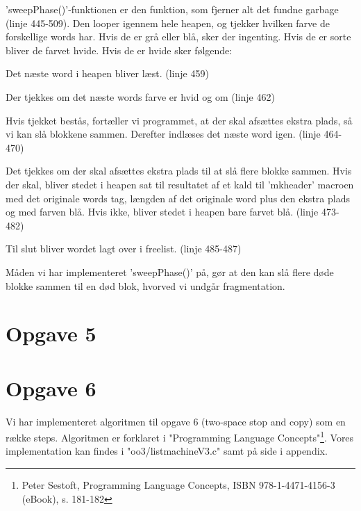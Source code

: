 'sweepPhase()'-funktionen er den funktion, som fjerner alt det fundne garbage (linje 445-509). Den looper igennem hele heapen, og tjekker hvilken farve de forskellige words har. Hvis de er grå eller blå, sker der ingenting. Hvis de er sorte bliver de farvet hvide. Hvis de er hvide sker følgende:
\begin{my_enumerate}
	\item Det næste word i heapen bliver læst. (linje 459)
	\item Der tjekkes om det næste words farve er hvid og om (linje 462) %
	\item Hvis tjekket bestås, fortæller vi programmet, at der skal afsættes ekstra plads, så vi kan slå blokkene sammen. Derefter indlæses det næste word igen. (linje 464-470)
	\item Det tjekkes om der skal afsættes ekstra plads til at slå flere blokke sammen. Hvis der skal, bliver stedet i heapen sat til resultatet af et kald til 'mkheader' macroen med det originale words tag, længden af det originale word plus den ekstra plads og med farven blå. Hvis ikke, bliver stedet i heapen bare farvet blå. (linje 473-482)
	\item Til slut bliver wordet lagt over i freelist. (linje 485-487)
\end{my_enumerate}

Måden vi har implementeret 'sweepPhase()' på, gør at den kan slå flere døde blokke sammen til en død blok, hvorved vi undgår fragmentation.

\section{Opgave 5}
\label{O5}

\section{Opgave 6}
\label{O6}
Vi har implementeret algoritmen til opgave 6 (two-space stop and copy) som en række steps. Algoritmen er forklaret i "Programming Language Concepts"\footnote{Peter Sestoft, Programming Language Concepts, ISBN 978-1-4471-4156-3 (eBook), s. 181-182}. Vores implementation kan findes i "oo3/listmachineV3.c" samt på side \pageref{Code_V3} i appendix.

